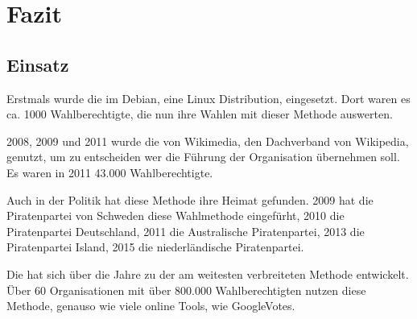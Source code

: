 \section{Fazit}
\label{sec:Fazit}

\subsection{Einsatz} 
\label{sec:einsatz}
Erstmals wurde die  im Debian, eine Linux Distribution, eingesetzt. Dort waren es ca. 1000 Wahlberechtigte, die nun ihre Wahlen mit dieser Methode auswerten. \citep{Debian2018}

2008, 2009 und 2011 wurde die \schulze von Wikimedia, den Dachverband von Wikipedia, genutzt, um zu entscheiden wer die Führung der Organisation übernehmen soll. Es waren in 2011 43.000 Wahlberechtigte. \citep{Schulze2017}

Auch in der Politik hat diese Methode ihre Heimat gefunden. 2009 hat die Piratenpartei von Schweden diese Wahlmethode eingefürht, 2010 die Piratenpartei Deutschland, 2011 die Australische Piratenpartei, 2013 die Piratenpartei Island, 2015 die niederländische Piratenpartei. \citep{Lohmann2013}

Die \schulze hat sich über die Jahre zu der am weitesten verbreiteten \condorcet Methode entwickelt. Über 60 Organisationen mit über 800.000 Wahlberechtigten nutzen diese Methode, genauso wie viele online Tools, wie GoogleVotes. \citep{Schulze2018}







